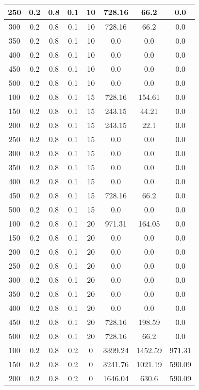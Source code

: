 \documentclass[a4paper, 12pt]{extreport}
\begin{document}
\begin{itemize}
\begin{longtable}{|c|c|c|c|c|c|c|c|}
			250 & 0.2 & 0.8 & 0.1 & 10 & 728.16 & 66.2 & 0.0 \\\hline
			300 & 0.2 & 0.8 & 0.1 & 10 & 728.16 & 66.2 & 0.0 \\\hline
			350 & 0.2 & 0.8 & 0.1 & 10 & 0.0 & 0.0 & 0.0 \\\hline
			400 & 0.2 & 0.8 & 0.1 & 10 & 0.0 & 0.0 & 0.0 \\\hline
			450 & 0.2 & 0.8 & 0.1 & 10 & 0.0 & 0.0 & 0.0 \\\hline
			500 & 0.2 & 0.8 & 0.1 & 10 & 0.0 & 0.0 & 0.0 \\\hline
			100 & 0.2 & 0.8 & 0.1 & 15 & 728.16 & 154.61 & 0.0 \\\hline
			150 & 0.2 & 0.8 & 0.1 & 15 & 243.15 & 44.21 & 0.0 \\\hline
			200 & 0.2 & 0.8 & 0.1 & 15 & 243.15 & 22.1 & 0.0 \\\hline
			250 & 0.2 & 0.8 & 0.1 & 15 & 0.0 & 0.0 & 0.0 \\\hline
			300 & 0.2 & 0.8 & 0.1 & 15 & 0.0 & 0.0 & 0.0 \\\hline
			350 & 0.2 & 0.8 & 0.1 & 15 & 0.0 & 0.0 & 0.0 \\\hline
			400 & 0.2 & 0.8 & 0.1 & 15 & 0.0 & 0.0 & 0.0 \\\hline
			450 & 0.2 & 0.8 & 0.1 & 15 & 728.16 & 66.2 & 0.0 \\\hline
			500 & 0.2 & 0.8 & 0.1 & 15 & 0.0 & 0.0 & 0.0 \\\hline
			100 & 0.2 & 0.8 & 0.1 & 20 & 971.31 & 164.05 & 0.0 \\\hline
			150 & 0.2 & 0.8 & 0.1 & 20 & 0.0 & 0.0 & 0.0 \\\hline
			200 & 0.2 & 0.8 & 0.1 & 20 & 0.0 & 0.0 & 0.0 \\\hline
			250 & 0.2 & 0.8 & 0.1 & 20 & 0.0 & 0.0 & 0.0 \\\hline
			300 & 0.2 & 0.8 & 0.1 & 20 & 0.0 & 0.0 & 0.0 \\\hline
			350 & 0.2 & 0.8 & 0.1 & 20 & 0.0 & 0.0 & 0.0 \\\hline
			400 & 0.2 & 0.8 & 0.1 & 20 & 0.0 & 0.0 & 0.0 \\\hline
			450 & 0.2 & 0.8 & 0.1 & 20 & 728.16 & 198.59 & 0.0 \\\hline
			500 & 0.2 & 0.8 & 0.1 & 20 & 728.16 & 66.2 & 0.0 \\\hline
			100 & 0.2 & 0.8 & 0.2 & 0 & 3399.24 & 1452.59 & 971.31 \\\hline
			150 & 0.2 & 0.8 & 0.2 & 0 & 3241.76 & 1021.19 & 590.09 \\\hline
			200 & 0.2 & 0.8 & 0.2 & 0 & 1646.04 & 630.6 & 590.09 \\\hline

\end{longtable}
\end{itemize}
\end{document}

